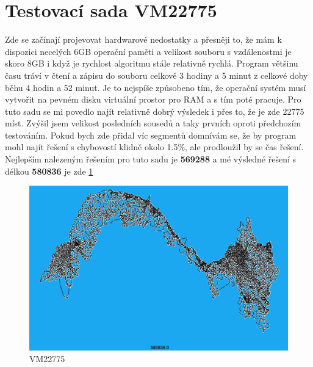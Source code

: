 \section{Testovací sada VM22775}
Zde se začínají projevovat hardwarové nedostatky a přesněji to, že mám k dispozici necelých 6GB operační paměti a velikost souboru s vzdálenostmi je skoro 8GB i když je rychlost algoritmu stále relativně rychlá. Program většinu času tráví v čtení a zápisu do souboru celkově 3 hodiny a 5 minut z celkové doby běhu 4 hodin a 52 minut. Je to nejspíše způsobeno tím, že operační systém musí vytvořit na pevném disku virtuální prostor pro RAM a s tím poté pracuje. Pro tuto sadu se mi povedlo najít relativně dobrý výsledek i přes to, že je zde 22775 míst. Zvýšil jsem velikost posledních sousedů a taky prvních oproti předchozím testováním. Pokud bych zde přidal víc segmentů domnívám se, že by program mohl najít řešení s chybovostí klidně okolo 1.5\%, ale prodloužil by se čas řešení. Nejlepším nalezeným řešením pro tuto sadu je \textbf{569288} a mé výsledné řešení s délkou \textbf{580836} je zde \ref{fig:VM22775}

\begin{table}[H]
\caption{VM22775}
\centering
{}
\end{table}

\begin{figure}[H]
    \centering
    \includegraphics[width=15cm]{obrazky-figures/VM22775.png}
    \caption{VM22775}
    \label{fig:VM22775}
\end{figure}


